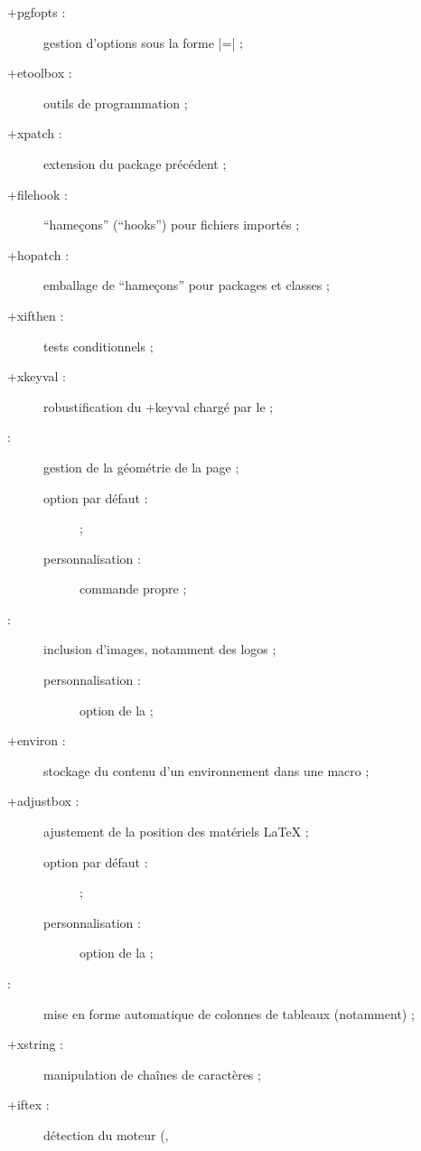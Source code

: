 \begin{description}
\item[\package*+{pgfopts} :] gestion d'options sous la forme
  |=| ;
\item[\package*+{etoolbox} :] outils de programmation ;
\item[\package*+{xpatch} :] extension du package précédent ;
\item[\package*+{filehook} :] \enquote{hameçons} (\foreignquote{english}{hooks})
  pour fichiers importés ;
\item[\package*+{hopatch} :] emballage de \enquote{hameçons} pour packages et
  classes ;
\item[\package*+{xifthen} :] tests conditionnels ;
\item[\package*+{xkeyval} :] robustification du \Package+{keyval} chargé par le
   ;
\item[ :] gestion de la géométrie de la page ;
  \begin{description}
  \item[option par défaut :]  ;
  \item[personnalisation :] commande propre  ;
  \end{description}
\item[ :] inclusion d'images, notamment des logos ;
  \begin{description}
  \item[personnalisation :] option  de la \yatCl{} ;
  \end{description}
\item[\package*+{environ} :] stockage du contenu d'un environnement dans une
  macro ;
\item[\package+{adjustbox} :] ajustement de la position des matériels
  \LaTeX{} ;
  \begin{description}
  \item[option par défaut :]  ;
  \item[personnalisation :] option  de la \yatCl{} ;
  \end{description}
\item[ :] mise en forme automatique de colonnes de tableaux
  (notamment) ;
\item[\package*+{xstring} :] manipulation de chaînes de caractères ;
\item[\package+{iftex} :] détection du moteur (, 

\end{description}
